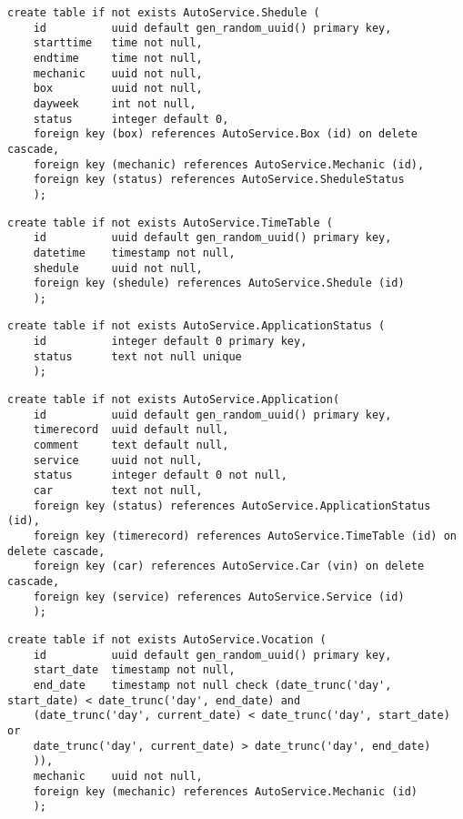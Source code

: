 \begin{lstlisting}[label=tb9, style=mystyle, caption=Создание таблицы Shedule и соотвествующих ограничений целостности]
	create table if not exists AutoService.Shedule (
	id			uuid default gen_random_uuid() primary key,
	starttime	time not null,
	endtime		time not null,
	mechanic	uuid not null,
	box			uuid not null,
	dayweek		int not null,
	status		integer default 0,
	foreign key (box) references AutoService.Box (id) on delete cascade,
	foreign key (mechanic) references AutoService.Mechanic (id),
	foreign key (status) references AutoService.SheduleStatus
	);
\end{lstlisting}

\begin{lstlisting}[label=tb10, style=mystyle, caption=Создание таблицы TimeTable и соотвествующих ограничений целостности]
	create table if not exists AutoService.TimeTable (
	id			uuid default gen_random_uuid() primary key,
	datetime	timestamp not null,
	shedule 	uuid not null,
	foreign key (shedule) references AutoService.Shedule (id)
	);
\end{lstlisting}

\begin{lstlisting}[label=tb11, style=mystyle, caption=Создание таблицы ApplicationStatus и соотвествующих ограничений целостности]
	create table if not exists AutoService.ApplicationStatus (
	id			integer default 0 primary key,
	status		text not null unique
	);
\end{lstlisting}

\begin{lstlisting}[label=tb12, style=mystyle, caption=Создание таблицы Application и соотвествующих ограничений целостности]
	create table if not exists AutoService.Application(
	id			uuid default gen_random_uuid() primary key,
	timerecord	uuid default null,
	comment 	text default null, 
	service		uuid not null,
	status 		integer default 0 not null,
	car 		text not null,
	foreign key (status) references AutoService.ApplicationStatus (id),
	foreign key (timerecord) references AutoService.TimeTable (id) on delete cascade,
	foreign key (car) references AutoService.Car (vin) on delete cascade,
	foreign key (service) references AutoService.Service (id)
	);
\end{lstlisting}

\begin{lstlisting}[label=tb13, style=mystyle, caption=Создание таблицы Vocation и соотвествующих ограничений целостности]
	create table if not exists AutoService.Vocation (
	id			uuid default gen_random_uuid() primary key,
	start_date	timestamp not null,
	end_date	timestamp not null check (date_trunc('day', start_date) < date_trunc('day', end_date) and 
	(date_trunc('day', current_date) < date_trunc('day', start_date) or 
	date_trunc('day', current_date) > date_trunc('day', end_date)
	)),
	mechanic	uuid not null,
	foreign key (mechanic) references AutoService.Mechanic (id)
	);
\end{lstlisting}

